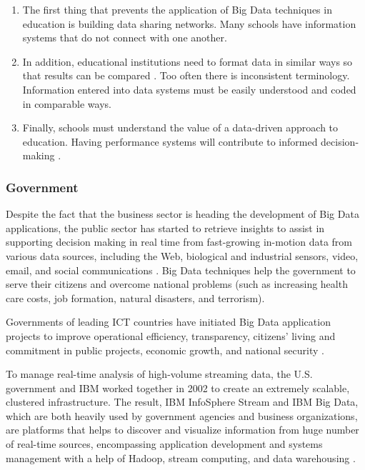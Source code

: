 \documentclass[runningheads]{llncs}
\begin{document}
\begin{enumerate}

\item The first thing that prevents the application of Big Data techniques in education is building data sharing networks. Many schools have information systems that do not connect with one another.\\

\item In addition, educational institutions need to format data in similar ways so that results can be compared \cite{EDUCATIONALDM}. Too often there is inconsistent terminology. Information entered into data
systems must be easily understood and coded in comparable ways.\\

\item Finally, schools must understand the value of a data-driven approach to education. Having performance systems will contribute to informed decision-making \cite{EDREPORT}.

\end{enumerate}

\subsubsection{Government}

Despite the fact that the business sector is heading the development of Big Data applications, the public sector has started to retrieve insights to assist in supporting decision making in real time from fast-growing in-motion data from various data sources, including the Web, biological and industrial sensors, video, email, and social communications \cite{DOME}. Big Data techniques help the government to serve their citizens and overcome national problems (such as increasing health care costs, job formation, natural disasters, and terrorism). 

Governments of leading ICT countries have initiated Big Data application projects to improve operational efficiency, transparency, citizens' living and commitment in public projects, economic growth, and national security \cite{ACM}.

To manage real-time analysis of high-volume streaming data, the U.S. government and IBM worked together in 2002 to create an extremely scalable, clustered infrastructure. The result, IBM InfoSphere Stream and IBM Big Data, which are both heavily used by government agencies and business organizations, are platforms that helps to discover and visualize information from huge number of real-time sources, encompassing application development and systems management with a help of Hadoop, stream computing, and data warehousing \cite{ACM}.
\end{document}

